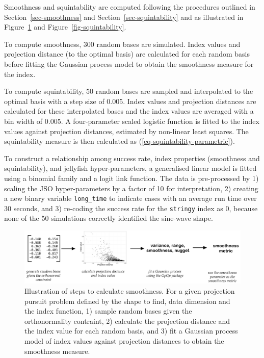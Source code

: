 \documentclass[
  12pt,
]{interact}
\theoremstyle{plain}
\begin{document}
Smoothness and squintability are computed following the procedures
outlined in Section~\ref{sec-smoothness} and
Section~\ref{sec-squintability} and as illustrated in
Figure~\ref{fig-smoothness} and Figure~\ref{fig-squintability}.

To compute smoothness, 300 random bases are simulated. Index values and
projection distance (to the optimal basis) are calculated for each
random basis before fitting the Gaussian process model to obtain the
smoothness measure for the index.

To compute squintability, 50 random bases are sampled and interpolated
to the optimal basis with a step size of 0.005. Index values and
projection distances are calculated for these interpolated bases and the
index values are averaged with a bin width of 0.005. A four-parameter
scaled logistic function is fitted to the index values against
projection distances, estimated by non-linear least squares. The
squintability measure is then calculated as
(\ref{eq-squintability-parametric}).

To construct a relationship among success rate, index properties
(smoothness and squintability), and jellyfish hyper-parameters, a
generalised linear model is fitted using a binomial family and a logit
link function. The data is pre-processed by 1) scaling the JSO
hyper-parameters by a factor of 10 for interpretation, 2) creating a new
binary variable \texttt{long\_time} to indicate cases with an average
run time over 30 seconds, and 3) re-coding the success rate for the
\texttt{stringy} index as 0, because none of the 50 simulations
correctly identified the sine-wave shape.

\begin{figure}

{\centering \includegraphics[width=1\textwidth,height=\textheight]{figures/smoothness.png}

}

\caption{\label{fig-smoothness}Illustration of steps to calculate
smoothness. For a given projection pursuit problem defined by the shape
to find, data dimension and the index function, 1) sample random bases
given the orthonormality contraint, 2) calculate the projection distance
and the index value for each random basis, and 3) fit a Gaussian process
model of index values against projection distances to obtain the
smoothness measure.}

\end{figure}
\end{document}
